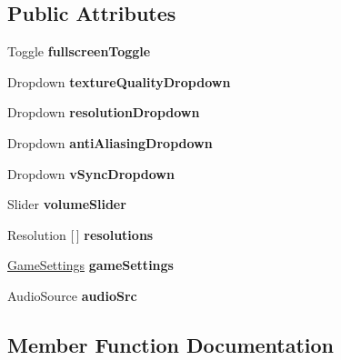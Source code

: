 \subsection*{Public Attributes}
\begin{DoxyCompactItemize}
\item 
\mbox{\label{class_settings_manager_aeb178646a8cc54153eb3d6bc6b2a5d5f}} 
Toggle {\bfseries fullscreen\+Toggle}
\item 
\mbox{\label{class_settings_manager_ac8e5588fbf4e9c627655961a46bce8da}} 
Dropdown {\bfseries texture\+Quality\+Dropdown}
\item 
\mbox{\label{class_settings_manager_a976721de4c42b799ef30a9de3205f0c7}} 
Dropdown {\bfseries resolution\+Dropdown}
\item 
\mbox{\label{class_settings_manager_a9915352526fb5ea3c95040d9e0ea70e8}} 
Dropdown {\bfseries anti\+Aliasing\+Dropdown}
\item 
\mbox{\label{class_settings_manager_ad0826d167efa606e5132e12d1fb02e20}} 
Dropdown {\bfseries v\+Sync\+Dropdown}
\item 
\mbox{\label{class_settings_manager_af608040b3d8be12b48202463dea09e78}} 
Slider {\bfseries volume\+Slider}
\item 
\mbox{\label{class_settings_manager_a9607a85ca00e52135c608e895dc01214}} 
Resolution \mbox{[}$\,$\mbox{]} {\bfseries resolutions}
\item 
\mbox{\label{class_settings_manager_aceed727e77a7db402a170fdaf94e9798}} 
\mbox{\hyperlink{class_game_settings}{Game\+Settings}} {\bfseries game\+Settings}
\item 
\mbox{\label{class_settings_manager_ad8435914e4f7e4fd7fc873c781f4db28}} 
Audio\+Source {\bfseries audio\+Src}
\end{DoxyCompactItemize}


\subsection{Member Function Documentation}
\mbox{\label{class_settings_manager_a9098e096f294c8289f888d1cef3d88e8}} 
